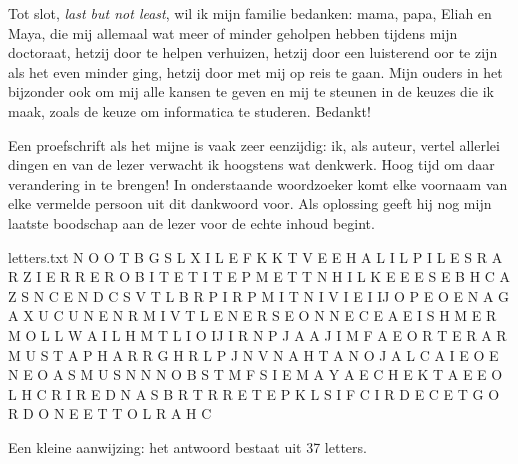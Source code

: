 \documentclass[main]{subfiles}
\begin{document}
Tot slot, \textit{last but not least}, wil ik mijn familie bedanken: mama, papa, Eliah en Maya, die mij allemaal wat meer of minder geholpen hebben tijdens mijn doctoraat, hetzij door te helpen verhuizen, hetzij door een luisterend oor te zijn als het even minder ging, hetzij door met mij op reis te gaan.
Mijn ouders in het bijzonder ook om mij alle kansen te geven en mij te steunen in de keuzes die ik maak, zoals de keuze om informatica te studeren.
Bedankt!

\pagebreak

Een proefschrift als het mijne is vaak zeer eenzijdig: ik, als auteur, vertel allerlei dingen en van de lezer verwacht ik hoogstens wat denkwerk.
Hoog tijd om daar verandering in te brengen!
In onderstaande woordzoeker komt elke voornaam van elke vermelde persoon uit dit dankwoord voor.
Als oplossing geeft hij nog mijn laatste boodschap aan de lezer voor de echte inhoud begint.

\begin{filecontents*}{letters.txt}
N O O T B G S L X I L E F K K T V
E E H A L I L P I L E S R A R Z I
E R R E R O B I T E T I T E P M E
T T N H I L K E E E S E B H C A Z
S N C E N D C S V T L B R P I R P
M I T N I V I E I IJ O P E O E N A
G A X U C U N E N R M I V T L E N
E R S E O N N E C E A E I S H M E
R M O L L W A I L H M T L I O IJ I
R N P J A A J I M F A E O R T E R
A R M U S T A P H A R R G H R L P
J N V N A H T A N O J A L C A I E
O E N E O A S M U S N N N O B S T
M F S I E M A Y A E C H E K T A E
E O L H C R I R E D N A S B R T R
R E T E P K L S I F C I R D E C E
T G O R D O N E E T T O L R A H C
\end{filecontents*}

\readarray*{}

\vspace{\fill}

\begin{wide}
\end{wide}

{\small Een kleine aanwijzing: het antwoord bestaat uit 37 letters.}



\end{document}

